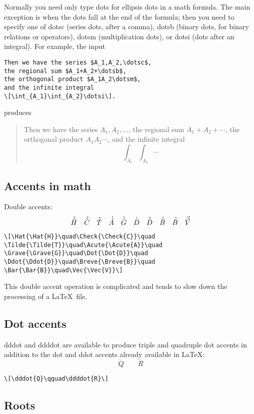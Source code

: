 \documentclass[draft]{amsart}
\newcommand{\ntt}{\normalfont\ttfamily}
\newcommand{\cn}[1]{{\protect\ntt\bslash#1}}
\theoremstyle{definition}
\theoremstyle{remark}
\begin{document}
Normally you need only type \cn{dots} for ellipsis dots in a
math formula.  The main exception is when the dots
fall at the end of the formula; then you need to
specify one of \cn{dotsc} (series dots, after a comma),
\cn{dotsb} (binary dots, for binary relations or operators),
\cn{dotsm} (multiplication dots), or \cn{dotsi} (dots after
an integral).  For example, the input
\begin{verbatim}
Then we have the series $A_1,A_2,\dotsc$,
the regional sum $A_1+A_2+\dotsb$,
the orthogonal product $A_1A_2\dotsm$,
and the infinite integral
\[\int_{A_1}\int_{A_2}\dotsi\].
\end{verbatim}
produces
\begin{quotation}
Then we have the series $A_1,A_2,\dotsc$,
the regional sum $A_1+A_2+\dotsb$,
the orthogonal product $A_1A_2\dotsm$,
and the infinite integral
\[\int_{A_1}\int_{A_2}\dotsi\]
\end{quotation}

\subsection{Accents in math}

Double accents:
\[\Hat{\Hat{H}}\quad\Check{\Check{C}}\quad
\Tilde{\Tilde{T}}\quad\Acute{\Acute{A}}\quad
\Grave{\Grave{G}}\quad\Dot{\Dot{D}}\quad
\Ddot{\Ddot{D}}\quad\Breve{\Breve{B}}\quad
\Bar{\Bar{B}}\quad\Vec{\Vec{V}}\]
\begin{verbatim}
\[\Hat{\Hat{H}}\quad\Check{\Check{C}}\quad
\Tilde{\Tilde{T}}\quad\Acute{\Acute{A}}\quad
\Grave{\Grave{G}}\quad\Dot{\Dot{D}}\quad
\Ddot{\Ddot{D}}\quad\Breve{\Breve{B}}\quad
\Bar{\Bar{B}}\quad\Vec{\Vec{V}}\]
\end{verbatim}
This double accent operation is complicated
and tends to slow down the processing of a \LaTeX\ file.


\subsection{Dot accents}
\cn{dddot} and \cn{ddddot} are available to
produce triple and quadruple dot accents
in addition to the \cn{dot} and \cn{ddot} accents already available
in \LaTeX:
\[\dddot{Q}\qquad\ddddot{R}\]
\begin{verbatim}
\[\dddot{Q}\qquad\ddddot{R}\]
\end{verbatim}

\subsection{Roots}
\end{document}
